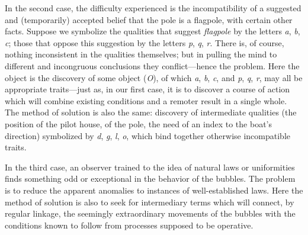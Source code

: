 \documentclass[letterpaper]{book}
\begin{document}

In the second case, the difficulty experienced is the incompatibility of
a suggested and (temporarily) accepted belief that the pole is a
flagpole, with certain other facts. Suppose we symbolize the qualities
that suggest \emph{flagpole} by the letters \emph{a}, \emph{b},
\emph{c}; those that oppose this suggestion by the letters \emph{p},
\emph{q}, \emph{r}. There is, of course, nothing inconsistent in the
qualities themselves; but in pulling the mind to different and
incongruous conclusions they conflict---hence the problem. Here the
object is the discovery of some object (\emph{O}), of which \emph{a},
\emph{b}, \emph{c}, and \emph{p}, \emph{q}, \emph{r}, may all be
appropriate traits---just as, in our first case, it is to discover a
course of action which will combine existing conditions and a remoter
result in a single whole. The method of solution is also the same:
discovery of intermediate qualities (the position of the pilot house, of
the pole, the need of an index to the boat's direction) symbolized by
\emph{d}, \emph{g}, \emph{l}, \emph{o}, which bind together otherwise
incompatible traits.


In the third case, an observer trained to the idea of natural laws or
uniformities finds something odd or exceptional in the behavior of the
bubbles. The problem is to reduce the apparent anomalies to instances of
well-established laws. Here the method of solution is also to seek for
intermediary terms which will connect, by regular linkage, the seemingly
extraordinary movements of the bubbles with the conditions known to
follow from processes supposed to be operative.

\end{document}
